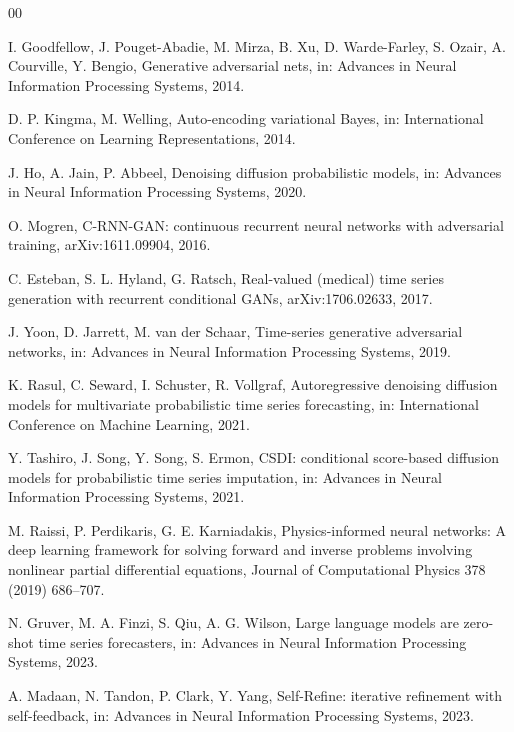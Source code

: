 \documentclass[review,3p,times]{elsarticle}
\begin{document}

\begin{thebibliography}{00}

I. Goodfellow, J. Pouget-Abadie, M. Mirza, B. Xu, D. Warde-Farley,
S. Ozair, A. Courville, Y. Bengio, Generative adversarial nets, in:
Advances in Neural Information Processing Systems, 2014.

D. P. Kingma, M. Welling, Auto-encoding variational Bayes, in:
International Conference on Learning Representations, 2014.

J. Ho, A. Jain, P. Abbeel, Denoising diffusion probabilistic models, in:
Advances in Neural Information Processing Systems, 2020.

O. Mogren, C-RNN-GAN: continuous recurrent neural networks with adversarial
training, arXiv:1611.09904, 2016.

C. Esteban, S. L. Hyland, G. Ratsch, Real-valued (medical) time series
generation with recurrent conditional GANs, arXiv:1706.02633, 2017.

J. Yoon, D. Jarrett, M. van der Schaar, Time-series generative adversarial
networks, in: Advances in Neural Information Processing Systems, 2019.

K. Rasul, C. Seward, I. Schuster, R. Vollgraf, Autoregressive denoising
diffusion models for multivariate probabilistic time series forecasting, in:
International Conference on Machine Learning, 2021.

Y. Tashiro, J. Song, Y. Song, S. Ermon, CSDI: conditional score-based
diffusion models for probabilistic time series imputation, in: Advances in
Neural Information Processing Systems, 2021.

M. Raissi, P. Perdikaris, G. E. Karniadakis, Physics-informed neural networks:
A deep learning framework for solving forward and inverse problems involving
nonlinear partial differential equations, Journal of Computational Physics 378
(2019) 686--707.

N. Gruver, M. A. Finzi, S. Qiu, A. G. Wilson, Large language models are
zero-shot time series forecasters, in: Advances in Neural Information
Processing Systems, 2023.

A. Madaan, N. Tandon, P. Clark, Y. Yang, Self-Refine: iterative refinement
with self-feedback, in: Advances in Neural Information Processing Systems,
2023.


\end{thebibliography}
\end{document}
